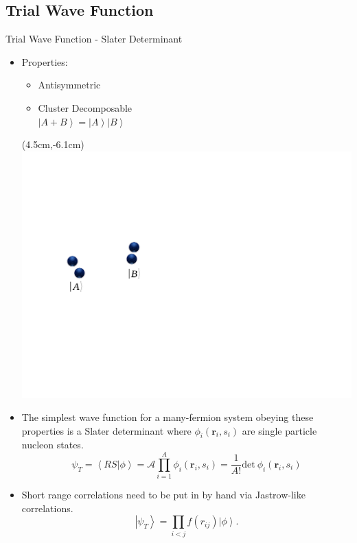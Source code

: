 \documentclass{beamer}
\newcommand{\ket}[1]{\left| #1 \right>}
\newcommand{\braket}[2]{\left< #1 | #2 \right>}
\begin{document}

\subsection{Trial Wave Function}
\begin{frame}{Trial Wave Function - Slater Determinant}
\begin{itemize}
   \item Properties:
   \begin{itemize}
      \item Antisymmetric
      \item Cluster Decomposable \\ $\ket{A+B} = \ket{A}\ket{B}$
   \end{itemize}
   \begin{textblock*}{\textwidth}(4.5cm,-6.1cm) %
      \includegraphics[width=14.6cm]{../figures/cluster.pdf}
   \end{textblock*}
   \item The simplest wave function for a many-fermion system obeying these properties is a Slater determinant where $\phi_i(\mathbf{r}_i,s_i)$ are single particle nucleon states.
   \begin{equation*}
      \psi_{T} = \braket{RS}{\phi}= \mathcal{A} \prod\limits_{i=1}^A \phi_i(\mathbf{r}_i,s_i) = \frac{1}{A!} \mathrm{det}~\phi_i(\mathbf{r}_i,s_i)
   \end{equation*}
   \item Short range correlations need to be put in by hand via Jastrow-like correlations.
   \begin{equation*}
      \ket{\psi_T} = \prod\limits_{i<j}f(r_{ij}) \ket{\phi}.
   \end{equation*}
\end{itemize}
\end{frame}
\end{document}

